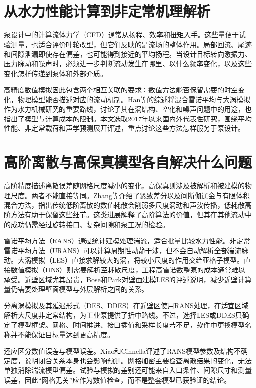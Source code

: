 
\section{从水力性能计算到非定常机理解析}

泵设计中的计算流体力学（CFD）通常从扬程、效率和扭矩入手。这些量便于试验测量，也适合评价叶轮改型，但它们反映的是流场的整体作用。局部回流、尾迹和间隙泄漏即使存在偏差，也可能得到接近的平均扬程。当设计目标转向激振力、压力脉动和噪声时，必须进一步判断流动发生在哪里、以什么频率变化，以及这些变化怎样传递到泵体和外部介质。

高精度数值模拟因此包含两个相互关联的要求：数值方法能否保留需要的时空变化，物理模型能否描述对应的流动机制。Han等的综述将混合雷诺平均与大涡模拟作为水力机械研究的重要路线，讨论了其在涡结构、空化和噪声问题中的用途，也指出了模型与计算成本的限制\cite{Han2024HybridReview}。本文选取2017年以来国内外代表性研究，围绕平均性能、非定常载荷和声学预测展开评述，重点讨论这些方法怎样服务于泵设计。

\section{高阶离散与高保真模型各自解决什么问题}

高阶精度描述离散误差随网格尺度减小的变化，高保真则涉及被解析和被建模的物理尺度。两者不能直接等同。Zhang等介绍了紧致差分以及间断伽辽金与有限体积混合方法，指出传统低阶离散的数值耗散会削弱多尺度涡动和声波传播，低耗散高阶方法有助于保留这些细节\cite{Zhang2017HighOrder}。这类进展解释了高阶算法的价值，但其在其他流动中的成功仍需经过旋转接口、复杂间隙和泵工况的检验。

雷诺平均方法（RANS）通过统计建模处理湍流，适合批量比较水力性能。非定常雷诺平均方法（URANS）可以计算周期性动静干涉，但不会自动解析全部湍流脉动。大涡模拟（LES）直接求解较大的涡，将较小尺度的作用交给亚格子模型。直接数值模拟（DNS）则需要解析至耗散尺度，工程高雷诺数整泵的成本通常难以承受。近壁区域尤其昂贵，Bose和Park对壁面建模LES的评述说明，减少近壁计算量仍需要处理壁面模型与外层解析之间的关系\cite{Bose2018WMLES}。

分离涡模拟及其延迟形式（DES、DDES）在近壁区使用RANS处理，在适宜区域解析大尺度非定常结构，为工业泵提供了折中路线\cite{Han2024HybridReview}。不过，选择LES或DDES只确定了模型框架。网格、时间推进、接口插值和采样长度若不足，软件中更换模型名称并不能保证目标量达到更高精度。

还应区分数值误差与模型误差。Xiao和Cinnella评述了RANS模型参数及结构不确定度，说明闭合关系本身也会影响预测\cite{Xiao2019Uncertainty}。网格加密主要检查离散结果的变化，无法单独消除湍流模型偏差。试验与模拟的差别还可能来自入口条件、间隙尺寸和测量误差，因此“网格无关”应作为数值检查，而不是整套模型已获验证的结论。

